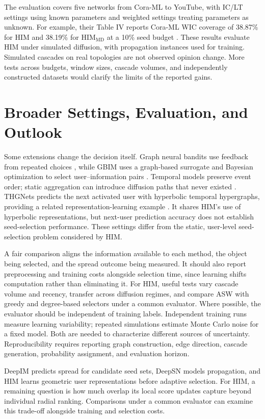 \documentclass[journal]{IEEEtran}
\begin{document}
The evaluation covers five networks from Cora-ML to YouTube, with IC/LT settings using known parameters and weighted settings treating parameters as unknown. For example, their Table IV reports Cora-ML WIC coverage of 38.87\% for HIM and 38.19\% for $\mathrm{HIM}_{\mathrm{MD}}$ at a 10\% seed budget \cite{him}. These results evaluate HIM under simulated diffusion, with propagation instances used for training. Simulated cascades on real topologies are not observed opinion change. More tests across budgets, window sizes, cascade volumes, and independently constructed datasets would clarify the limits of the reported gains.


\section{Broader Settings, Evaluation, and Outlook}
Some extensions change the decision itself. Graph neural bandits use feedback from repeated choices \cite{bandit}, while GBIM uses a graph-based surrogate and Bayesian optimization to select user--information pairs \cite{gbim}. Temporal models preserve event order; static aggregation can introduce diffusion paths that never existed \cite{temporal}. THGNets predicts the next activated user with hyperbolic temporal hypergraphs, providing a related representation-learning example \cite{thgnets}. It shares HIM's use of hyperbolic representations, but next-user prediction accuracy does not establish seed-selection performance. These settings differ from the static, user-level seed-selection problem considered by HIM.

A fair comparison aligns the information available to each method, the object being selected, and the spread outcome being measured. It should also report preprocessing and training costs alongside selection time, since learning shifts computation rather than eliminating it. For HIM, useful tests vary cascade volume and recency, transfer across diffusion regimes, and compare ASW with greedy and degree-based selectors under a common evaluator. Where possible, the evaluator should be independent of training labels. Independent training runs measure learning variability; repeated simulations estimate Monte Carlo noise for a fixed model. Both are needed to characterize different sources of uncertainty. Reproducibility requires reporting graph construction, edge direction, cascade generation, probability assignment, and evaluation horizon.

DeepIM predicts spread for candidate seed sets, DeepSN models propagation, and HIM learns geometric user representations before adaptive selection. For HIM, a remaining question is how much overlap its local score updates capture beyond individual radial ranking. Comparisons under a common evaluator can examine this trade-off alongside training and selection costs.
\end{document}
